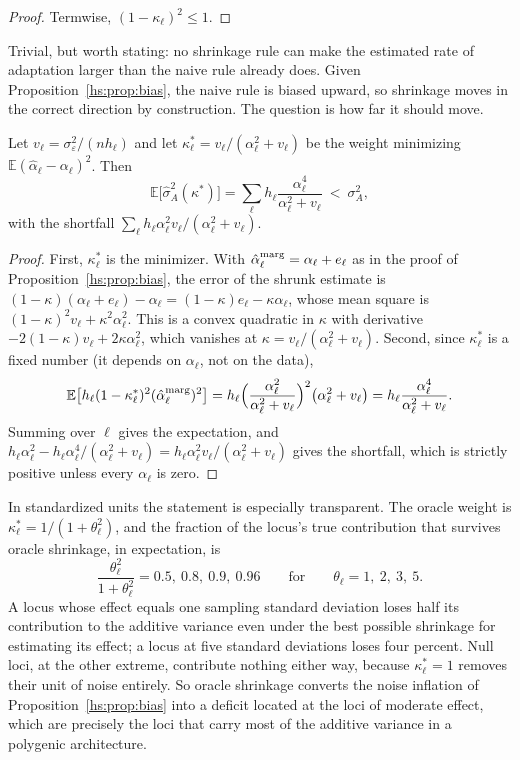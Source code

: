 \begin{proof}
Termwise, $(1-\kappa_\ell)^2 \le 1$.
\end{proof}

Trivial, but worth stating: no shrinkage rule can make the estimated rate of adaptation larger than the naive rule already does. Given Proposition~\ref{hs:prop:bias}, the naive rule is biased upward, so shrinkage moves in the correct direction by construction. The question is how far it should move.

\begin{proposition}
\label{hs:prop:oracle}
Let $v_\ell = \sigma^2_\varepsilon/(n h_\ell)$ and let $\kappa^*_\ell = v_\ell/(\alpha_\ell^2 + v_\ell)$ be the weight minimizing $\mathbb{E}(\hat\alpha_\ell - \alpha_\ell)^2$. Then
\[
\mathbb{E}\big[\hat\sigma^2_A(\kappa^*)\big] = \sum_\ell h_\ell \frac{\alpha_\ell^4}{\alpha_\ell^2 + v_\ell} \ <\ \sigma^2_A ,
\]
with the shortfall $\sum_\ell h_\ell \alpha_\ell^2 v_\ell/(\alpha_\ell^2+v_\ell)$.
\end{proposition}

\begin{proof}
First, $\kappa^*_\ell$ is the minimizer. With $\hat\alpha^{\rm marg}_\ell = \alpha_\ell + e_\ell$ as in the proof of Proposition~\ref{hs:prop:bias}, the error of the shrunk estimate is $(1-\kappa)(\alpha_\ell + e_\ell) - \alpha_\ell = (1-\kappa)e_\ell - \kappa\alpha_\ell$, whose mean square is $(1-\kappa)^2v_\ell + \kappa^2\alpha_\ell^2$. This is a convex quadratic in $\kappa$ with derivative $-2(1-\kappa)v_\ell + 2\kappa\alpha_\ell^2$, which vanishes at $\kappa = v_\ell/(\alpha_\ell^2+v_\ell)$. Second, since $\kappa^*_\ell$ is a fixed number (it depends on $\alpha_\ell$, not on the data),
\[
\mathbb{E}\big[h_\ell(1-\kappa^*_\ell)^2(\hat\alpha^{\rm marg}_\ell)^2\big]
= h_\ell\Big(\frac{\alpha_\ell^2}{\alpha_\ell^2+v_\ell}\Big)^2\big(\alpha_\ell^2+v_\ell\big)
= h_\ell\frac{\alpha_\ell^4}{\alpha_\ell^2+v_\ell}.
\]
Summing over $\ell$ gives the expectation, and $h_\ell\alpha_\ell^2 - h_\ell\alpha_\ell^4/(\alpha_\ell^2+v_\ell) = h_\ell\alpha_\ell^2v_\ell/(\alpha_\ell^2+v_\ell)$ gives the shortfall, which is strictly positive unless every $\alpha_\ell$ is zero.
\end{proof}

In standardized units the statement is especially transparent. The oracle weight is $\kappa^*_\ell = 1/(1+\theta_\ell^2)$, and the fraction of the locus's true contribution that survives oracle shrinkage, in expectation, is
\[
\frac{\theta_\ell^2}{1+\theta_\ell^2} = 0.5,\ 0.8,\ 0.9,\ 0.96 \qquad\text{for}\qquad \theta_\ell = 1,\ 2,\ 3,\ 5 .
\]
A locus whose effect equals one sampling standard deviation loses half its contribution to the additive variance even under the best possible shrinkage for estimating its effect; a locus at five standard deviations loses four percent. Null loci, at the other extreme, contribute nothing either way, because $\kappa^*_\ell = 1$ removes their unit of noise entirely. So oracle shrinkage converts the noise inflation of Proposition~\ref{hs:prop:bias} into a deficit located at the loci of moderate effect, which are precisely the loci that carry most of the additive variance in a polygenic architecture.

